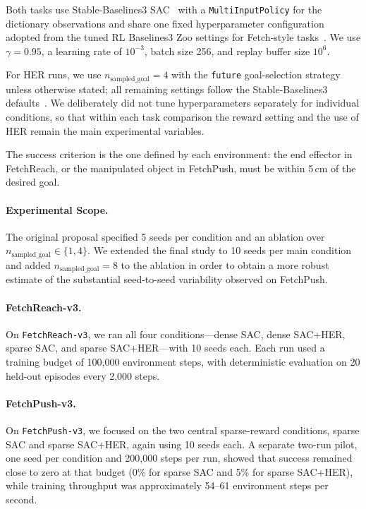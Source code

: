 \documentclass{article}
\begin{document}
Both tasks use Stable-Baselines3 SAC~\cite{raffin21sb3} with a
\texttt{MultiInputPolicy} for the dictionary observations and share one fixed
hyperparameter configuration adopted from the tuned RL Baselines3 Zoo settings
for Fetch-style tasks~\cite{raffin20zoo}. We use $\gamma = 0.95$, a learning
rate of $10^{-3}$, batch size 256, and replay buffer size $10^6$.

For HER runs, we use $n_{\text{sampled\_goal}} = 4$ with the
\texttt{future} goal-selection strategy unless otherwise stated; all remaining
settings follow the Stable-Baselines3 defaults~\cite{raffin21sb3}. We
deliberately did not tune hyperparameters separately for individual conditions,
so that within each task comparison the reward setting and the use of HER
remain the main experimental variables.

The success criterion is the one defined by each environment: the end effector
in FetchReach, or the manipulated object in FetchPush, must be within
5\,cm of the desired goal.

\paragraph{Experimental Scope.}
The original proposal specified 5 seeds per condition and an ablation over
$n_{\text{sampled\_goal}} \in \{1,4\}$. We extended the final study to
10 seeds per main condition and added $n_{\text{sampled\_goal}} = 8$ to the
ablation in order to obtain a more robust estimate of the substantial
seed-to-seed variability observed on FetchPush.

\paragraph{FetchReach-v3.}
On \texttt{FetchReach-v3}, we ran all four conditions---dense SAC,
dense SAC+HER, sparse SAC, and sparse SAC+HER---with 10 seeds each.
Each run used a training budget of 100,000 environment steps, with deterministic
evaluation on 20 held-out episodes every 2,000 steps.

\paragraph{FetchPush-v3.}
On \texttt{FetchPush-v3}, we focused on the two central sparse-reward
conditions, sparse SAC and sparse SAC+HER, again using 10 seeds each.
A separate two-run pilot, one seed per condition and 200,000 steps per run,
showed that success remained close to zero at that budget (0\% for sparse SAC
and 5\% for sparse SAC+HER), while training throughput was approximately
54--61 environment steps per second.
\end{document}
